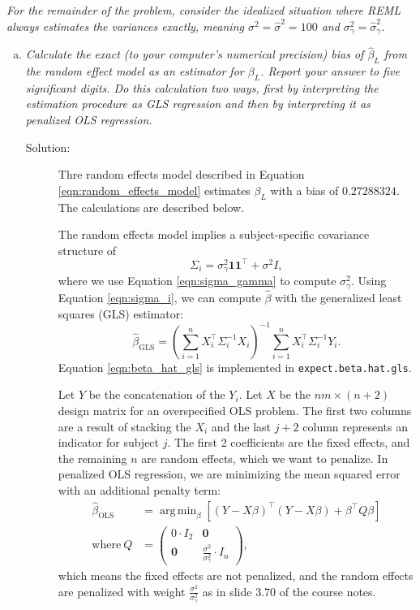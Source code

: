 \documentclass[11pt, letterpaper]{article}
\DeclareMathOperator*{\argmin}{arg\,min}
\begin{document}
{\em For the remainder of the problem, consider the idealized situation where REML always estimates the variances
exactly, meaning $\sigma^2=\hat{\sigma}^2=100$ and $\sigma^2_\gamma=\hat{\sigma}^2_\gamma$.}
\begin{enumerate}[(a)]
\addtocounter{enumi}{6}
\item {\em Calculate the exact (to your computer's numerical precision) bias of $\hat{\beta}_L$ from the random effect model as an estimator for $\beta_L$.  Report your answer to five significant digits.  Do this calculation two ways, first by interpreting the estimation procedure as GLS regression and then by interpreting it as penalized OLS regression.}

\begin{description}
\item[Solution:] Thre random effects model described in Equation
  \ref{eqn:random_effects_model} estimates $\beta_L$ with a bias of
  $\boxed{0.27288324.}$ The calculations are described below.

  The random effects model implies a subject-specific covariance structure of
  \begin{equation}
    \Sigma_i = \sigma^2_\gamma\mathbf{1}\mathbf{1}^\intercal + \sigma^2I,
    \label{eqn:sigma_i}
  \end{equation}
  where we use Equation \ref{eqn:sigma_gamma} to compute
  $\sigma_\gamma^2$. Using Equation \ref{eqn:sigma_i}, we can compute
  $\hat{\beta}$ with the generalized least squares (GLS) estimator:
  \begin{equation}
    \hat{\beta}_{\text{GLS}} = \left(\sum_{i=1}^nX_i^\intercal \Sigma_i^{-1}X_i\right)^{-1}
    \sum_{i=1}^n X_i^\intercal\Sigma_i^{-1}Y_i.
    \label{eqn:beta_hat_gls}
  \end{equation}
  Equation \ref{eqn:beta_hat_gls} is implemented in
  \texttt{expect.beta.hat.gls}.

  Let $Y$ be the concatenation of the $Y_i$. Let $X$ be the $nm \times (n + 2)$
  design matrix for an overspecified OLS problem. The first two columns are a
  result of stacking the $X_i$ and the last $j + 2$ column represents an
  indicator for subject $j$. The first 2 coefficients are the fixed effects, and
  the remaining $n$ are random effects, which we want to penalize. In penalized
  OLS regression, we are minimizing the mean squared error with an additional
  penalty term:
  \begin{align}
    \hat{\beta}_{\text{OLS}}
    &= \argmin_{\beta}\left[
      \left(Y - X\beta\right)^\intercal\left(Y - X\beta\right)
      +
      \beta^\intercal Q\beta
      \right] \label{eqn:penalized_ols_objective}\\
    \text{where}~
    Q &= \begin{pmatrix}
      0 \cdot I_2 & \mathbf{0} \\
      \mathbf{0} & \frac{\sigma^2}{\sigma_\gamma^2} \cdot I_n
    \end{pmatrix}, \nonumber
  \end{align}
  which means the fixed effects are not penalized, and the random effects are
  penalized with weight $\frac{\sigma^2}{\sigma_\gamma^2}$ as in slide 3.70 of
  the course notes.


\end{description}
\end{enumerate}
\end{document}
